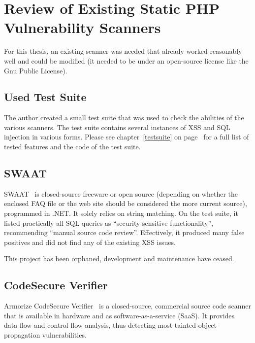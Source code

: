 \chapter{Review of Existing Static PHP Vulnerability Scanners}
\label{scanners}

For this thesis, an existing scanner was needed that already worked reasonably well and could be modified (\ie it needed to be under an open-source license like the Gnu Public License).

\section{Used Test Suite}
The author created a small test suite that was used to check the abilities of the various scanners. The test suite contains several instances of XSS and SQL injection in various forms. Please see chapter~\ref{testsuite} on page~\pageref{testsuite} for a full list of tested features and the code of the test suite.



\section{SWAAT}
\label{swaat}
SWAAT~\cite{swaat} is closed-source freeware or open source (depending on whether the enclosed FAQ file or the web site should be considered the more current source), programmed in .NET. It solely relies on string matching. On the test suite, it listed practically all SQL queries as ``security sensitive functionality'', recommending ``manual source code review''. Effectively, it produced many false positives and did not find any of the existing XSS issues.

This project has been orphaned, \ie development and maintenance have ceased.

\section{CodeSecure Verifier}
\label{armorize}
Armorize CodeSecure Verifier~\cite{codesecure, verifier} is a closed-source, commercial source code scanner that is available in hardware and as software-as-a-service (SaaS). It provides data-flow and control-flow analysis, thus detecting most tainted-object-propagation vulnerabilities.

